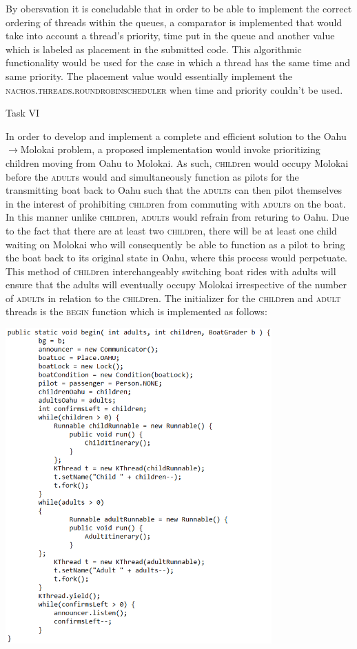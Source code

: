 \documentclass[12pt]{article}
\begin{document}
{By obersvation it is concludable that in order to be able to implement the correct ordering of threads within the queues, a comparator is implemented that would take into account a thread's priority, time put in the queue and another value which is labeled as placement in the submitted code. This algorithmic functionality would be used for the case in which a thread has the same time and same priority. The placement value would essentially implement the \textsc{nachos.threads.roundrobinscheduler} when time and priority couldn't be used. 
\begin{center}Task VI\end{center}
In order to develop and implement a complete and efficient solution to the Oahu$\longrightarrow$Molokai problem, a proposed implementation would invoke prioritizing children moving from Oahu to Molokai. As such, \textsc{child}ren would occupy Molokai before the \textsc{adult}s would and simultaneously function as pilots for the transmitting boat back to Oahu such that the \textsc{adult}s can then pilot themselves in the interest of prohibiting \textsc{child}ren from commuting with \textsc{adult}s on the boat. In this manner unlike \textsc{child}ren, \textsc{adult}s would refrain from returing to Oahu. Due to the fact that there are at least two \textsc{child}ren, there will be at least one child waiting on Molokai who will consequently be able to function as a pilot to bring the boat back to its original state in Oahu, where this process would perpetuate. This method of \textsc{child}ren interchangeably switching boat rides with adults will ensure that the adults will eventually occupy Molokai irrespective of the number of \textsc{adult}s in relation to the \textsc{child}ren. The initializer for the \textsc{child}ren and \textsc{adult} threads is the \textsc{begin} function which is implemented as follows:
\begin{center} \includegraphics[width=102mm]{pic5.png} \end{center}
}
\end{document}
